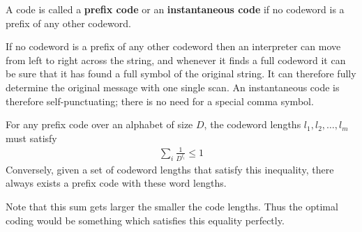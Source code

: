 \begin{definition}
	A code is called a \textbf{prefix code} or an \textbf{instantaneous code} if no codeword is a prefix of any other codeword. 
\end{definition}
If no codeword is a prefix of any other codeword then an interpreter can move from left to right across the string, and whenever it finds a full codeword it can be sure that it has found a full symbol of the original string. It can therefore fully determine the original message with one single scan. An instantaneous code is therefore self-punctuating; there is no need for a special comma symbol.
\begin{theorem}
	For any prefix code over an alphabet of size $D$, the codeword lengths $l_1,l_2,\ldots,l_m$ must satisfy 
	\begin{align}
		\sum_i \frac{1}{D^{l_i}} \leq 1
	\end{align}
Conversely, given a set of codeword lengths that satisfy this inequality, there always exists a prefix code with these word lengths. 
\end{theorem}
Note that this sum gets larger the smaller the code lengths. Thus the optimal coding would be something which satisfies this equality perfectly. 

